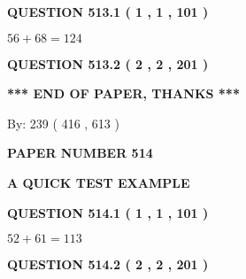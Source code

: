 \documentclass[12pt]{article}
\begin{document}
{\textbf{\Large{QUESTION
513.1 
 ( 1 , 1 , 101 )
}}}
  
  
 
 

$ %
56 +  %
68=   %
124$
 
 
  
\vspace{0.2in}
  
{\textbf{\Large{QUESTION
513.2 
 ( 2 , 2 , 201 )
}}}
  
  
   
   
 \vspace{0.2in}
 
   
   
   
   
\vspace{1.0in} 
{\textbf{\large{ *** END OF PAPER, THANKS *** }}} 
   
   
\hspace{1.0in} By: 
 239 ( 416 ,  613 )
   
   
   
   
\newpage 
\setcounter{page}{ 
   514001 } 
   
   
   
   
 {\textbf{ \Large{ PAPER NUMBER  514  }}}
   
   
\vspace{0.2in}
   
   
   
   
   
   
 \vspace{0.2in}
{\LARGE {\textbf{ A QUICK TEST EXAMPLE}}}
   
   
  
\vspace{0.2in}
  
{\textbf{\Large{QUESTION
514.1 
 ( 1 , 1 , 101 )
}}}
  
  
 
 

$ %
52 +  %
61=   %
113$
 
 
  
\vspace{0.2in}
  
{\textbf{\Large{QUESTION
514.2 
 ( 2 , 2 , 201 )
}}}
  
  
   
   
 \vspace{0.2in}
 
   
   
\end{document}
